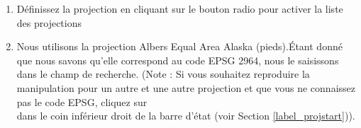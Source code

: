 \begin{enumerate}
  \item Définissez la projection en cliquant sur le bouton radio  pour activer la liste des projections
  \item Nous utilisons la projection Albers Equal Area Alaska (pieds).Étant donné que nous savons qu'elle correspond au code EPSG 2964, nous le saisissons dans le champ de recherche. (Note : Si vous souhaitez reproduire la manipulation pour un autre  et une autre projection et que vous ne connaissez pas le code EPSG, cliquez sur\\  dans le coin inférieur droit de la barre d'état (voir Section \ref{label_projstart})).
  

\end{enumerate}
